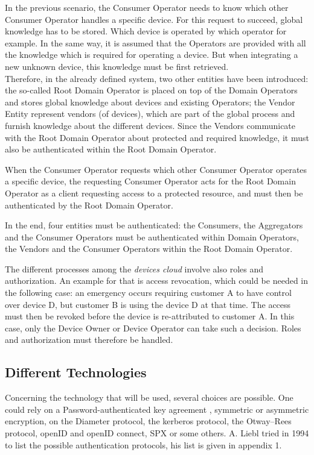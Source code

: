 In the previous scenario, the Consumer Operator needs to know which other Consumer Operator handles a specific device. For this request to succeed, global knowledge has to be stored. Which device is operated by which operator for example. In the same way, it is assumed that the Operators are provided with all the knowledge which is required for operating a device. But when integrating a new unknown device, this knowledge must be first retrieved. \\Therefore, in the already defined system, two other entities have been introduced: the so-called Root Domain Operator is placed on top of the Domain Operators and stores global knowledge about devices and existing Operators; the Vendor Entity represent vendors (of devices), which are part of the global process and furnish knowledge about the different devices. Since the Vendors communicate with the Root Domain Operator about protected and required knowledge, it must also be authenticated within the Root Domain Operator. 

When the Consumer Operator requests which other Consumer Operator operates a specific device, the requesting Consumer Operator acts for the Root Domain Operator as a client requesting access to a protected resource, and must then be authenticated by the Root Domain Operator.

In the end, four entities must be authenticated: the Consumers, the Aggregators and the Consumer Operators must be authenticated within Domain Operators, the Vendors and the Consumer Operators within the Root Domain Operator.

The different processes among the \emph{devices cloud} involve also roles and authorization. An example for that is access revocation, which could be needed in the following case: an emergency occurs requiring customer A to have control over device D, but customer B is using the device D at that time. The access must then be revoked before the device is re-attributed to customer A. In this case, only the Device Owner or Device Operator can take such a decision. Roles and authorization must therefore be handled.

\subsection{Different Technologies}
Concerning the technology that will be used, several choices are possible. One could rely on a Password-authenticated key agreement \cite{Hao2011}\cite{Pointcheval2012}\cite{Juang2008}, symmetric or asymmetric encryption\cite{Woo1997}\cite{Denning1982}, on the Diameter protocol, the kerberos protocol\cite{Sundareswaran}, the Otway–Rees protocol, openID\cite{Ghazizadeh} and openID connect, SPX\cite{Tardo1991} or some others. A. Liebl tried in 1994 to list the possible authentication protocols, his list is given in appendix 1.

